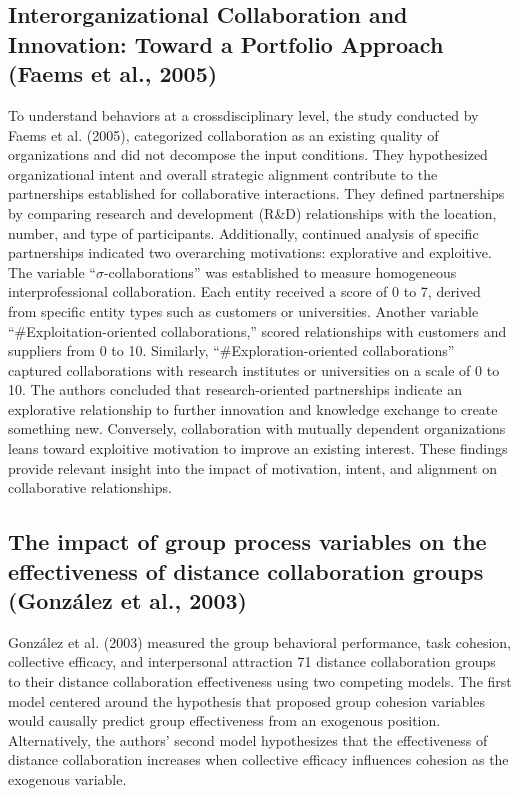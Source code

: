 \documentclass[sn-nature]{sn-jnl}%
\theoremstyle{thmstyleone}%
\theoremstyle{thmstyletwo}%
\theoremstyle{thmstylethree}%
\begin{document}
\subsection{Interorganizational Collaboration and Innovation: Toward a Portfolio Approach (Faems et al., 2005)\cite{faems_interorganizational_2005}}
To understand behaviors at a crossdisciplinary level, the study conducted by Faems et al. (2005), categorized collaboration as an existing quality of organizations and did not decompose the input conditions. They hypothesized organizational intent and overall strategic alignment contribute to the partnerships established for collaborative interactions\cite{faems_interorganizational_2005}. They defined partnerships by comparing research and development (R\&D) relationships with the location, number, and type of participants. Additionally, continued analysis of specific partnerships indicated two overarching motivations: explorative and exploitive. The variable \enquote{$\sigma$-collaborations} was established to measure homogeneous interprofessional collaboration. Each entity received a score of 0 to 7, derived from specific entity types such as customers or universities.  Another variable \enquote{\#Exploitation-oriented collaborations,} scored relationships with customers and suppliers from 0 to 10. Similarly, \enquote{\#Exploration-oriented collaborations} captured collaborations with research institutes or universities on a scale of 0 to 10\cite{faems_interorganizational_2005}. The authors concluded that research-oriented partnerships indicate an explorative relationship to further innovation and knowledge exchange to create something new. Conversely, collaboration with mutually dependent organizations leans toward exploitive motivation to improve an existing interest\cite{faems_interorganizational_2005}. These findings provide relevant insight into the impact of motivation, intent, and alignment on collaborative relationships.

\subsection{The impact of group process variables on the effectiveness of distance collaboration groups (González et al., 2003)\cite{gonzalez_impact_2003}}
González et al. (2003) measured the group behavioral performance, task cohesion, collective efficacy, and interpersonal attraction 71 distance collaboration groups to their distance collaboration effectiveness using two competing models. The first model centered around the hypothesis that proposed group cohesion variables would causally predict group effectiveness from an exogenous position. Alternatively, the authors’ second model hypothesizes that the effectiveness of distance collaboration increases when collective efficacy influences cohesion as the exogenous variable\cite{gonzalez_impact_2003}.
\end{document}
